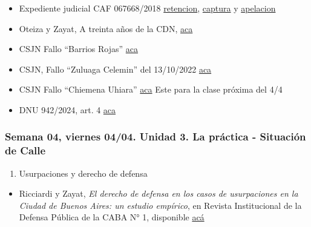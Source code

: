 \documentclass[
]{article}
\providecommand{\tightlist}{%
  \setlength{\itemsep}{0pt}\setlength{\parskip}{0pt}}
\begin{document}
\begin{itemize}
\item
  Expediente judicial CAF 067668/2018
  \href{https://drive.google.com/file/d/1MszNbvuQgl56ukSCbql4ggAAKyiia5Bs/view?usp=sharing}{retencion},
  \href{https://drive.google.com/file/d/11RSJ0lXuMKwhQy-gVHfODbc-AH1fBE0j/view?usp=sharing}{captura}
  y
  \href{https://drive.google.com/file/d/1xsXyT2y3F7sGL8yhK8kG6GTfhkYi7nVw/view?usp=sharing}{apelacion}
\item
  Oteiza y Zayat, A treinta años de la CDN,
  \href{https://drive.google.com/file/d/1rZbIfh3834THG1K07moFq1Cgp_zmYtsk/view?usp=sharing}{aca}
\item
  CSJN Fallo ``Barrios Rojas''
  \href{https://drive.google.com/file/d/15DQUBVIVb6feRRGwkksVgjZT9qRLTdOL/view?usp=sharing}{aca}
\item
  CSJN, Fallo ``Zuluaga Celemin'' del 13/10/2022
  \href{https://drive.google.com/file/d/1B0sp1vdW7HV6fYlQxB1nLoCG4GXRYcR8/view?usp=sharing}{aca}
\item
  CSJN Fallo ``Chiemena Uhiara''
  \href{https://drive.google.com/file/d/1m4EdxUp68KgqEPfTHjRH59QR_IDpFAk5/view?usp=sharing}{aca}
  Este para la clase próxima del 4/4
\item
  DNU 942/2024, art. 4
  \href{https://servicios.infoleg.gob.ar/infolegInternet/anexos/405000-409999/405520/norma.htm}{aca}
\end{itemize}

\subsubsection{Semana 04, viernes 04/04. Unidad 3. La práctica -
Situación de
Calle}\label{semana-04-viernes-0404.-unidad-3.-la-pruxe1ctica---situaciuxf3n-de-calle}

\begin{enumerate}
\def\labelenumi{\alph{enumi}.}
\setcounter{enumi}{1}
\tightlist
\item
  Usurpaciones y derecho de defensa
\end{enumerate}

\begin{itemize}
\tightlist
\item
  Ricciardi y Zayat, \emph{El derecho de defensa en los casos de
  usurpaciones en la Ciudad de Buenos Aires: un estudio empírico}, en
  Revista Institucional de la Defensa Pública de la CABA N° 1,
  disponible
  \href{https://drive.google.com/file/d/1KeqFSqkZ2aBrHXkRcIaZCVu6AMSaX7zH/view?usp=sharing}{acá}
\end{itemize}
\end{document}
